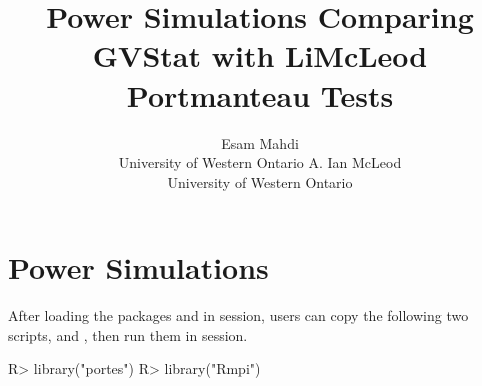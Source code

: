 \documentclass[article,nojss]{jss}
\author{Esam Mahdi\\ University of
               Western Ontario \And
         A. Ian McLeod\\University of
         Western Ontario}
\title{Power Simulations Comparing GVStat with LiMcLeod Portmanteau Tests}
\begin{document}



\section[Power Simulations]{Power Simulations}
\label{PowerSimulations}

After loading the packages  and  in  session,
users can copy the following two  scripts,  and , 
then run them in  session.

\begin{Schunk}
\begin{Sinput}
R> library("portes")
R> library("Rmpi")
 \end{Sinput}
 \end{Schunk}
\end{document}
